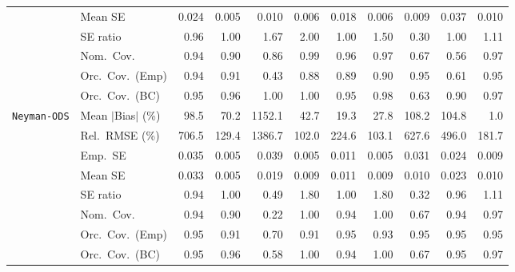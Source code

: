 \begin{landscape}
\begin{longtable}{llrrrrrrrrr}
 & Mean SE & 0.024 & 0.005 & 0.010 & 0.006 & 0.018 & 0.006 & 0.009 & 0.037 & 0.010 \\
 & SE ratio & \cellcolor{ranktwo}0.96 & \cellcolor{rankone}1.00 & 1.67 & 2.00 & \cellcolor{rankone}1.00 & 1.50 & 0.30 & \cellcolor{rankone}1.00 & \cellcolor{rankthree}1.11 \\
 & Nom.\ Cov. & \cellcolor{rankone}0.94 & 0.90 & 0.86 & \cellcolor{rankthree}0.99 & \cellcolor{rankone}0.96 & \cellcolor{ranktwo}0.97 & 0.67 & 0.56 & \cellcolor{ranktwo}0.97 \\
 & Orc.\ Cov.\ (Emp) & \cellcolor{ranktwo}0.94 & \cellcolor{rankthree}0.91 & 0.43 & 0.88 & 0.89 & 0.90 & \cellcolor{rankone}0.95 & 0.61 & \cellcolor{rankone}0.95 \\
 & Orc.\ Cov.\ (BC) & \cellcolor{rankone}0.95 & \cellcolor{ranktwo}0.96 & 1.00 & 1.00 & \cellcolor{rankone}0.95 & 0.98 & 0.63 & 0.90 & \cellcolor{rankthree}0.97 \\
\addlinespace[2pt]
\quad \texttt{Neyman-ODS} & Mean $|$Bias$|$ (\%) & 98.5 & 70.2 & 1152.1 & 42.7 & \cellcolor{ranktwo}19.3 & \cellcolor{rankthree}27.8 & 108.2 & 104.8 & \cellcolor{rankone}1.0 \\
 & Rel.\ RMSE (\%) & 706.5 & \cellcolor{rankthree}129.4 & 1386.7 & \cellcolor{rankone}102.0 & 224.6 & \cellcolor{ranktwo}103.1 & 627.6 & 496.0 & 181.7 \\
 & Emp.\ SE & 0.035 & 0.005 & 0.039 & 0.005 & 0.011 & 0.005 & 0.031 & 0.024 & 0.009 \\
 & Mean SE & 0.033 & 0.005 & 0.019 & 0.009 & 0.011 & 0.009 & 0.010 & 0.023 & 0.010 \\
 & SE ratio & \cellcolor{rankthree}0.94 & \cellcolor{rankone}1.00 & 0.49 & 1.80 & \cellcolor{rankone}1.00 & 1.80 & 0.32 & \cellcolor{ranktwo}0.96 & 1.11 \\
 & Nom.\ Cov. & \cellcolor{rankone}0.94 & \cellcolor{rankthree}0.90 & 0.22 & \cellcolor{rankthree}1.00 & \cellcolor{rankone}0.94 & \cellcolor{rankthree}1.00 & 0.67 & \cellcolor{rankone}0.94 & \cellcolor{ranktwo}0.97 \\
 & Orc.\ Cov.\ (Emp) & \cellcolor{rankone}0.95 & \cellcolor{rankthree}0.91 & 0.70 & \cellcolor{rankthree}0.91 & \cellcolor{rankone}0.95 & \cellcolor{ranktwo}0.93 & \cellcolor{rankone}0.95 & \cellcolor{rankone}0.95 & \cellcolor{rankone}0.95 \\
 & Orc.\ Cov.\ (BC) & \cellcolor{rankone}0.95 & \cellcolor{ranktwo}0.96 & 0.58 & 1.00 & \cellcolor{ranktwo}0.94 & 1.00 & 0.67 & \cellcolor{rankone}0.95 & \cellcolor{rankthree}0.97 \\

\end{longtable}
\end{landscape}
